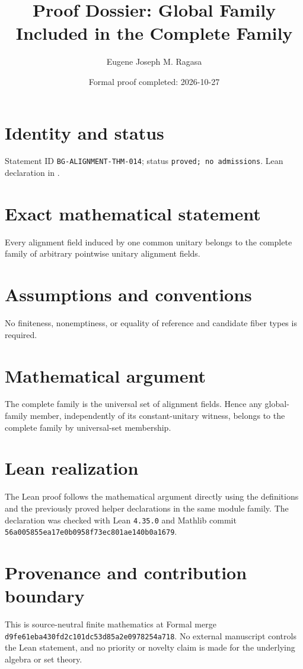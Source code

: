 \documentclass[11pt]{article}
\title{Proof Dossier: Global Family Included in the Complete Family}
\author{Eugene Joseph M. Ragasa}
\date{Formal proof completed: 2026-10-27}
\begin{document}
\raggedright
\maketitle

\section{Identity and status}
Statement ID \texttt{BG-ALIGNMENT-THM-014}; status \texttt{proved; no admissions}.  Lean declaration
 in
.

\section{Exact mathematical statement}
Every alignment field induced by one common unitary belongs to the complete family of arbitrary pointwise unitary alignment fields.

\section{Assumptions and conventions}
No finiteness, nonemptiness, or equality of reference and candidate fiber types is required.

\section{Mathematical argument}
The complete family is the universal set of alignment fields.  Hence any global-family member, independently of its constant-unitary witness, belongs to the complete family by universal-set membership.

\section{Lean realization}
The Lean proof follows the mathematical argument directly using the definitions and the
previously proved helper declarations in the same module family.  The declaration was checked
with Lean \texttt{4.35.0} and Mathlib commit \texttt{56a005855ea17e0b0958f73ec801ae140b0a1679}.

\section{Provenance and contribution boundary}
This is source-neutral finite mathematics at Formal merge
\texttt{d9fe61eba430fd2c101dc53d85a2e0978254a718}.  No external manuscript controls the Lean statement, and no priority or
novelty claim is made for the underlying algebra or set theory.
\end{document}

